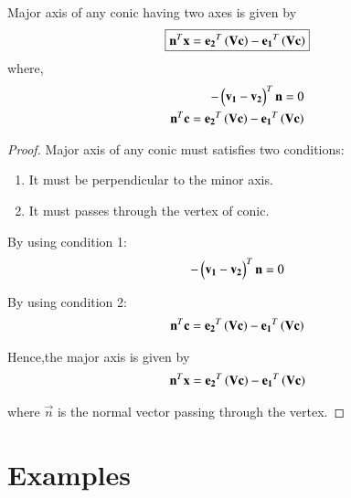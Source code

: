 \documentclass[journal,12pt,twocolumn]{IEEEtran}
\begin{document}
\begin{lemma}
Major axis of any conic having two axes is given by
\begin{align}
     \boxed{\mathbf{n}^T\mathbf{x} = \mathbf{e_2}^T\left(\mathbf{V}\mathbf{c}\right) - \mathbf{e_1}^T\left(\mathbf{V}\mathbf{c}\right)}
\end{align}
where,
\begin{align}
    -\begin{pmatrix}\mathbf{v_1} - \mathbf{v_2}\end{pmatrix}^T\mathbf{n} = 0 
    \\
    \mathbf{n}^T\mathbf{c} = \mathbf{e_2}^T\left(\mathbf{V}\mathbf{c}\right) - \mathbf{e_1}^T\left(\mathbf{V}\mathbf{c}\right)
\end{align}
\end{lemma}

\begin{proof}
Major axis of any conic must satisfies two conditions:

\begin{enumerate}
    \item It must be perpendicular to the minor axis.
    \item It must passes through the vertex of conic.
\end{enumerate}

By using condition 1:
\begin{align}
    -\begin{pmatrix}\mathbf{v_1} - \mathbf{v_2}\end{pmatrix}^T\mathbf{n} = 0 
\end{align}

By using condition 2:
\begin{align}
    \mathbf{n}^T\mathbf{c} = \mathbf{e_2}^T\left(\mathbf{V}\mathbf{c}\right) - \mathbf{e_1}^T\left(\mathbf{V}\mathbf{c}\right)
\end{align}

Hence,the major axis is given by
\begin{align}
    \mathbf{n}^T\mathbf{x} = \mathbf{e_2}^T\left(\mathbf{V}\mathbf{c}\right) - \mathbf{e_1}^T\left(\mathbf{V}\mathbf{c}\right)
\end{align}

where $\vec{n}$ is the normal vector passing through the vertex.
\end{proof}

\section{Examples}
\end{document}
